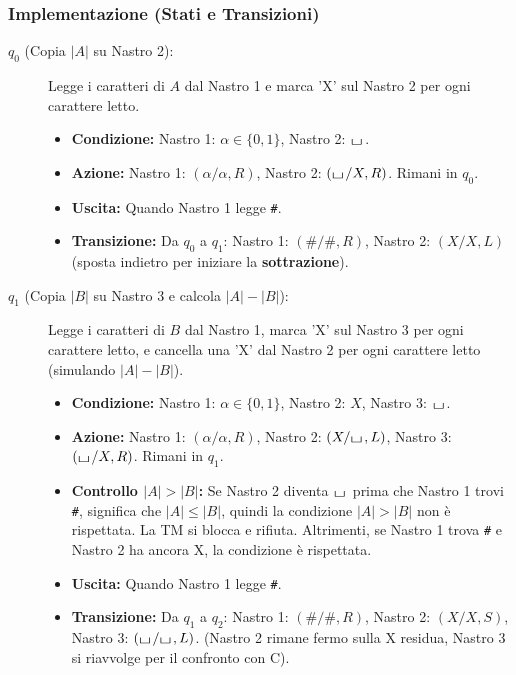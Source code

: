 \documentclass[a4paper]{article}
\theoremstyle{definition} %
\newcommand{\blankS}{\ensuremath{\raisebox{-0.15ex}{\scalebox{1.3}[0.7]{$\sqcup$}}\mkern2mu}}
\begin{document}
\subsubsection{Implementazione (Stati e Transizioni)}
\begin{description}
    \item[$q_0$ (Copia $|A|$ su Nastro 2):] Legge i caratteri di $A$ dal Nastro 1 e marca 'X' sul Nastro 2 per ogni carattere letto.
    \begin{itemize}
        \item \textbf{Condizione:} Nastro 1: $\alpha \in \{0,1\}$, Nastro 2: $\blankS$.
        \item \textbf{Azione:} Nastro 1: $(\alpha/\alpha, R)$, Nastro 2: $(\blankS/X, R)$. Rimani in $q_0$.
        \item \textbf{Uscita:} Quando Nastro 1 legge \texttt{\#}.
        \item \textbf{Transizione:} Da $q_0$ a $q_1$: Nastro 1: $(\texttt{\#}/\texttt{\#}, R)$, Nastro 2: $(X/X, L)$ (sposta indietro per iniziare la \textbf{sottrazione}).
    \end{itemize}
    \item[$q_1$ (Copia $|B|$ su Nastro 3 e calcola $|A|-|B|$):] Legge i caratteri di $B$ dal Nastro 1, marca 'X' sul Nastro 3 per ogni carattere letto, e cancella una 'X' dal Nastro 2 per ogni carattere letto (simulando $|A|-|B|$).
    \begin{itemize}
        \item \textbf{Condizione:} Nastro 1: $\alpha \in \{0,1\}$, Nastro 2: $X$, Nastro 3: $\blankS$.
        \item \textbf{Azione:} Nastro 1: $(\alpha/\alpha, R)$, Nastro 2: $(X/\blankS, L)$, Nastro 3: $(\blankS/X, R)$. Rimani in $q_1$.
        \item \textbf{Controllo $|A|>|B|$:} Se Nastro 2 diventa $\blankS$ prima che Nastro 1 trovi \texttt{\#}, significa che $|A| \le |B|$, quindi la condizione $|A|>|B|$ non è rispettata. La TM si blocca e rifiuta. Altrimenti, se Nastro 1 trova \texttt{\#} e Nastro 2 ha ancora X, la condizione è rispettata.
        \item \textbf{Uscita:} Quando Nastro 1 legge \texttt{\#}.
        \item \textbf{Transizione:} Da $q_1$ a $q_2$: Nastro 1: $(\texttt{\#}/\texttt{\#}, R)$, Nastro 2: $(X/X, S)$, Nastro 3: $(\blankS/\blankS, L)$. (Nastro 2 rimane fermo sulla X residua, Nastro 3 si riavvolge per il confronto con C).
    \end{itemize}

\end{description}
\end{document}
